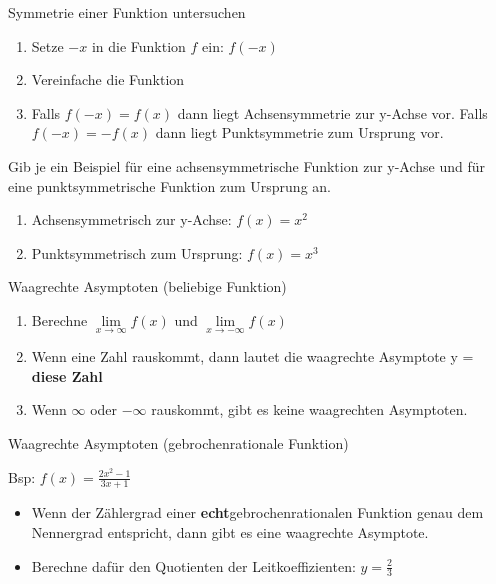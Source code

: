 \begin{frage}Symmetrie einer Funktion untersuchen\end{frage}
\begin{antwort}\begin{enumerate}
		\item Setze $-x$ in die Funktion $f$ ein: $f(-x)$
		\item Vereinfache die Funktion
		\item Falls $f(-x)=f(x)$ dann liegt Achsensymmetrie zur y-Achse vor. Falls $f(-x)=-f(x)$ dann liegt Punktsymmetrie zum Ursprung vor.
	\end{enumerate}\end{antwort}
\begin{frage}Gib je ein Beispiel für eine achsensymmetrische Funktion zur y-Achse und für eine punktsymmetrische Funktion zum Ursprung an.\end{frage}
\begin{antwort}\begin{enumerate}
		\item Achsensymmetrisch zur y-Achse: $f(x)=x^2$
		\item Punktsymmetrisch zum Ursprung: $f(x)=x^3$
	\end{enumerate}\end{antwort}
\begin{frage}Waagrechte Asymptoten (beliebige Funktion)\end{frage}
\begin{antwort}\begin{enumerate} 
		\item Berechne $\lim\limits_{x \rightarrow \infty}{f(x)}$ und $\lim\limits_{x \rightarrow -\infty}{f(x)}$	
		
		\item Wenn eine Zahl rauskommt, dann lautet die waagrechte Asymptote y = \textbf{diese Zahl}
		
		\item Wenn $\infty$ oder  $-\infty$ rauskommt, gibt es keine waagrechten Asymptoten.
			
	\end{enumerate}\end{antwort}
\begin{frage}Waagrechte Asymptoten (gebrochenrationale Funktion)\bigskip
	
	Bsp: $f(x)=\frac{2x^2-1}{3x+1}$\end{frage}
\begin{antwort}\begin{itemize} 
		\item \large Wenn der Zählergrad einer \textbf{echt}gebrochenrationalen Funktion genau dem Nennergrad entspricht, dann gibt es eine waagrechte Asymptote.	
		\item Berechne dafür den Quotienten der Leitkoeffizienten: $y=\frac{2}{3}$	
	\end{itemize}\end{antwort}
